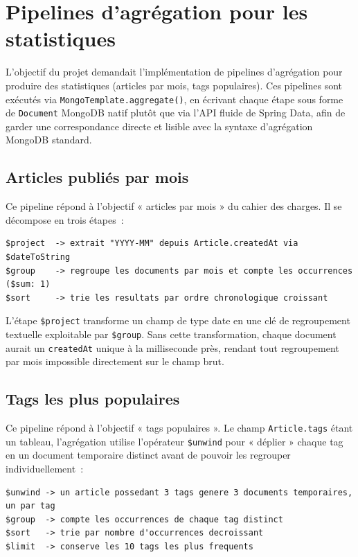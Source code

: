 \documentclass[11pt,a4paper]{article}
\begin{document}
\section{Pipelines d'agrégation pour les statistiques}
L'objectif du projet demandait l'implémentation de pipelines d'agrégation pour produire des statistiques (articles par mois, tags populaires). Ces pipelines sont exécutés via \texttt{MongoTemplate.aggregate()}, en écrivant chaque étape sous forme de \texttt{Document} MongoDB natif plutôt que via l'API fluide de Spring Data, afin de garder une correspondance directe et lisible avec la syntaxe d'agrégation MongoDB standard.

\subsection{Articles publiés par mois}
Ce pipeline répond à l'objectif « articles par mois » du cahier des charges. Il se décompose en trois étapes~:

\begin{lstlisting}
$project  -> extrait "YYYY-MM" depuis Article.createdAt via $dateToString
$group    -> regroupe les documents par mois et compte les occurrences ($sum: 1)
$sort     -> trie les resultats par ordre chronologique croissant
\end{lstlisting}

L'étape \texttt{\$project} transforme un champ de type date en une clé de regroupement textuelle exploitable par \texttt{\$group}. Sans cette transformation, chaque document aurait un \texttt{createdAt} unique à la milliseconde près, rendant tout regroupement par mois impossible directement sur le champ brut.

\subsection{Tags les plus populaires}
Ce pipeline répond à l'objectif « tags populaires ». Le champ \texttt{Article.tags} étant un tableau, l'agrégation utilise l'opérateur \texttt{\$unwind} pour « déplier » chaque tag en un document temporaire distinct avant de pouvoir les regrouper individuellement~:

\begin{lstlisting}
$unwind -> un article possedant 3 tags genere 3 documents temporaires, un par tag
$group  -> compte les occurrences de chaque tag distinct
$sort   -> trie par nombre d'occurrences decroissant
$limit  -> conserve les 10 tags les plus frequents
\end{lstlisting}
\end{document}
